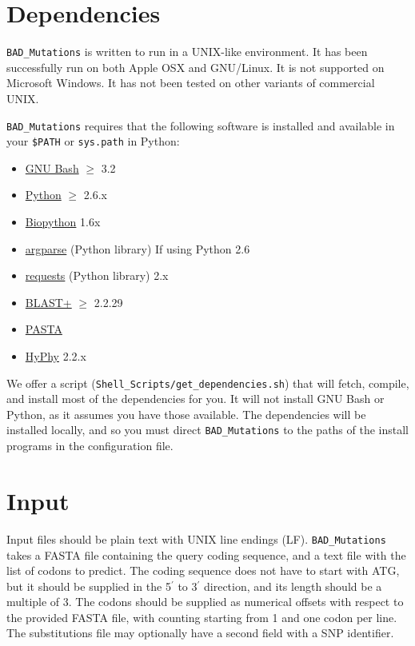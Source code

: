\documentclass[12pt]{article}
\newcommand{\BM}{\texttt{BAD\_Mutations} }
\begin{document}
\section*{Dependencies}
\par \BM is written to run in a UNIX-like environment. It has been successfully
run on both Apple OSX and GNU/Linux. It is not supported on Microsoft Windows.
It has not been tested on other variants of commercial UNIX.

\par \BM requires that the following software is installed and
available in your \texttt{\$PATH} or \texttt{sys.path} in Python:
\begin{itemize}[noitemsep]
    \item \href{https://www.gnu.org/software/bash/}{GNU Bash} $\geq$ 3.2
    \item \href{https://www.python.org/}{Python} $\geq$ 2.6.x
    \item \href{http://biopython.org/}{Biopython} 1.6x
    \item \href{https://code.google.com/p/argparse/}{argparse} (Python library) If using Python 2.6
    \item \href{http://docs.python-requests.org/en/latest/}{requests} (Python library) 2.x
    \item \href{https://blast.ncbi.nlm.nih.gov/Blast.cgi?PAGE_TYPE=BlastDocs&DOC_TYPE=Download}{BLAST+} $\geq$ 2.2.29
    \item \href{http://www.cs.utexas.edu/~phylo/software/pasta/}{PASTA}
    \item \href{http://hyphy.org/}{HyPhy} 2.2.x
\end{itemize}

\par We offer a script (\texttt{Shell\_Scripts/get\_dependencies.sh}) that will
fetch, compile, and install most of the dependencies for you. It will not
install GNU Bash or Python, as it assumes you have those available. The
dependencies will be installed locally, and so you must direct \BM to the paths
of the install programs in the configuration file.

\section*{Input}
\par Input files should be plain text with UNIX line endings (LF). \BM takes a
FASTA file containing the query coding sequence, and a text file with the list
of codons to predict. The coding sequence does not have to start with ATG, but
it should be supplied in the 5$^{\prime}$ to 3$^{\prime}$ direction, and its
length should be a multiple of 3. The codons should be supplied as numerical
offsets with respect to the provided FASTA file, with counting starting from 1
and one codon per line. The substitutions file may optionally have a second
field with a SNP identifier.
\end{document}
